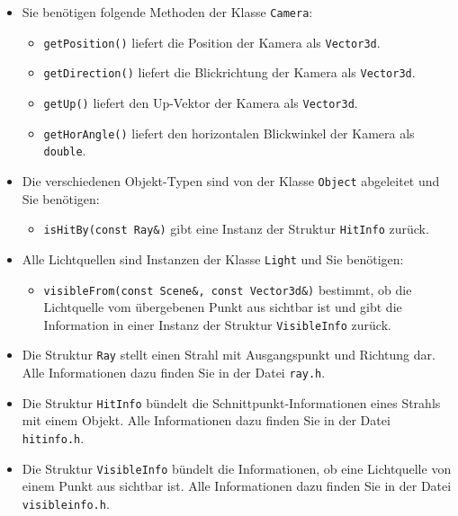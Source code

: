\begin{itemize}
  \item Sie benötigen folgende Methoden der Klasse \texttt{Camera}:
        \begin{itemize}
          \item \texttt{getPosition()} liefert die Position der Kamera 
                als \texttt{Vector3d}.
          \item \texttt{getDirection()} liefert die Blickrichtung der 
                Kamera als \texttt{Vector3d}.
          \item \texttt{getUp()} liefert den Up-Vektor der Kamera als 
                \texttt{Vector3d}.
          \item \texttt{getHorAngle()} liefert den horizontalen 
                Blickwinkel der Kamera als \texttt{double}.
      \end{itemize}
  \item Die verschiedenen Objekt-Typen sind von der Klasse
        \texttt{Object} abgeleitet und Sie benötigen:
        \begin{itemize}
          \item \texttt{isHitBy(const Ray\&)} gibt eine Instanz der 
                Struktur \texttt{HitInfo} zurück.
        \end{itemize}
  \item Alle Lichtquellen sind Instanzen der Klasse \texttt{Light} und 
        Sie benötigen:
        \begin{itemize}
          \item \texttt{visibleFrom(const Scene\&, const Vector3d\&)}
                bestimmt, ob die Lichtquelle vom übergebenen Punkt aus 
                sichtbar ist und gibt die Information in einer Instanz 
                der Struktur \texttt{VisibleInfo} zurück.
        \end{itemize}
  \item Die Struktur \texttt{Ray} stellt einen Strahl mit Ausgangspunkt 
        und Richtung dar. Alle Informationen dazu finden Sie in der 
        Datei \texttt{ray.h}.
  \item Die Struktur \texttt{HitInfo} bündelt die 
        Schnittpunkt-Informationen eines Strahls mit einem Objekt. Alle
        Informationen dazu finden Sie in der Datei \texttt{hitinfo.h}.
  \item Die Struktur \texttt{VisibleInfo} bündelt die Informationen,
        ob eine Lichtquelle von einem Punkt aus sichtbar ist. Alle
        Informationen dazu finden Sie in der Datei \texttt{visibleinfo.h}.
\end{itemize}
